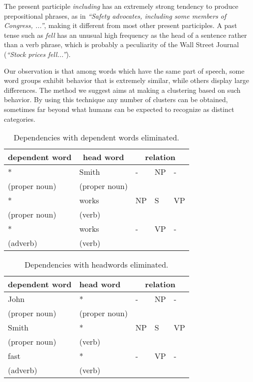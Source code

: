 The present participle {\em including} has an extremely strong tendency to produce
prepositional phrases, as in {\em ``Safety advocates, including some
members of Congress, ...''}, making it different from most other present participles.
A past tense such as {\em fell} has an unusual high frequency as the
head of a sentence rather than a verb phrase, which is probably a
peculiarity of the Wall Street Journal ({\em ``Stock prices
fell...''}).

Our observation is that among words which have the same part of
speech, some word groups exhibit behavior that is extremely similar,
while others display large differences. The method we suggest aims at
making a clustering based on such behavior.  By using this technique
any number of clusters can be obtained, sometimes far beyond what
humans can be expected to recognize as distinct categories.

\begin{table}[thbc]
\begin{center}
\caption{Dependencies with dependent words eliminated.}
\begin{tabular}{|l|l|lll|} \hline
dependent word & 
       \multicolumn{1}{|c|}{head word} & 
       \multicolumn{3}{|c|}{relation} \\ \hline
* & Smith         & - & NP & - \\ 
(proper noun)     & (proper noun) & & & \\ \hline
* & works  & NP & S & VP \\
(proper noun) & (verb) & & &\\ \hline
* & works &  - & VP & - \\
(adverb) & (verb) & & & \\ \hline
\end{tabular}
\label{elimdep}
\end{center}
\end{table}

\begin{table}[thbc]
\begin{center}
\caption{Dependencies with headwords eliminated.}
\begin{tabular}{|l|l|lll|} \hline
\multicolumn{1}{|c|}{dependent word} & 
     head word & 
       \multicolumn{3}{|c|}{relation} \\ \hline
John & * & - & NP & - \\
(proper noun) & (proper noun) & & & \\ \hline
Smith & * & NP & S & VP \\ 
(proper noun) & (verb) & & & \\ \hline
fast & * & - & VP & - \\ 
(adverb) & (verb) &  & & \\ \hline
\end{tabular}
\label{elimhead}
\end{center}
\end{table}

